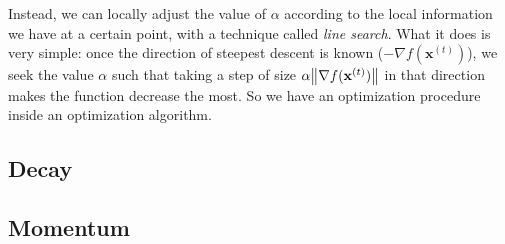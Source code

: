 Instead, we can locally adjust the value of $\alpha$ according to the local information we have at a certain point, with a technique called \emph{line search}. What it does is very simple: once the direction of steepest descent is known ($- \nabla f( \mathbf{x}^{(t)})$), we seek the value $\alpha$ such that taking a step of size $\alpha \norm{\nabla f( \mathbf{x}^{(t)} )}$ in that direction makes the function decrease the most. So we have an optimization procedure inside an optimization algorithm.

\subsection{Decay} 

\subsection{Momentum} 


